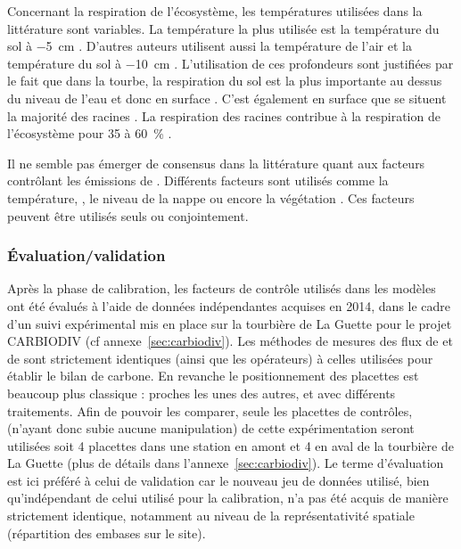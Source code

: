 Concernant la respiration de l'écosystème, les températures utilisées dans la littérature sont variables.
La température la plus utilisée est la température du sol à \SI{-5}{\centi\metre}  \citep{ballantyne2014}.
D'autres auteurs utilisent aussi la température de l'air et la température du sol à \SI{-10}{\centi\metre} \citep{bortoluzzi2006a,kim1992}.
L'utilisation de ces profondeurs sont justifiées par le fait que dans la tourbe, la respiration du sol est la plus importante au dessus du niveau de l'eau et donc en surface \citep{Luo200661}. %
C'est également en surface que se situent la majorité des racines \citep{rydin2013c}.
La respiration des racines contribue à la respiration de l'écosystème pour 35 à \SI{60}{\percent} \citep{silvola1996,crow2005}.

Il ne semble pas émerger de consensus dans la littérature quant aux facteurs contrôlant les émissions de \chh.
Différents facteurs sont utilisés comme la température, \citep{alm1999,bubier1995b}, le niveau de la nappe \citep{bubier1993} ou encore la végétation \citep{bortoluzzi2006a}.
Ces facteurs peuvent être utilisés seuls ou conjointement.

\subsubsection{Évaluation/validation}

Après la phase de calibration, les facteurs de contrôle utilisés dans les modèles ont été évalués à l'aide de données indépendantes acquises en 2014, dans le cadre d'un suivi expérimental mis en place sur la tourbière de La Guette pour le projet CARBIODIV (cf annexe~\ref{sec:carbiodiv}).
Les méthodes de mesures des flux de \coo et de \chh sont strictement identiques (ainsi que les opérateurs) à celles utilisées pour établir le bilan de carbone.
En revanche le positionnement des placettes est beaucoup plus classique : proches les unes des autres, et avec différents traitements.
Afin de pouvoir les comparer, seule les placettes de contrôles, (n'ayant donc subie aucune manipulation) de cette expérimentation seront utilisées soit 4 placettes dans une station en amont et 4 en aval de la tourbière de La Guette (plus de détails dans l'annexe~\ref{sec:carbiodiv}).
Le terme d'évaluation est ici préféré à celui de validation car le nouveau jeu de données utilisé, bien qu'indépendant de celui utilisé pour la calibration, n'a pas été acquis de manière strictement identique, notamment au niveau de la représentativité spatiale (répartition des embases sur le site).

